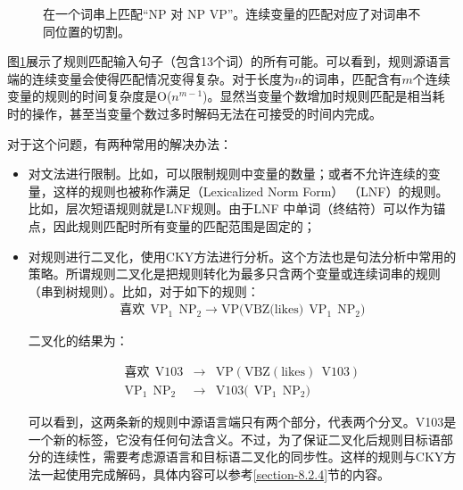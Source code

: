 \begin{figure}[htp]
\centering

\caption{在一个词串上匹配“NP 对 NP VP”。连续变量的匹配对应了对词串不同位置的切割。}
\label{fig:8-43}
\end{figure}

\parinterval 图\ref{fig:8-43}展示了规则匹配输入句子（包含13个词）的所有可能。可以看到，规则源语言端的连续变量会使得匹配情况变得复杂。对于长度为$n$的词串，匹配含有$m$个连续变量的规则的时间复杂度是O($n^{m-1}$)。显然当变量个数增加时规则匹配是相当耗时的操作，甚至当变量个数过多时解码无法在可接受的时间内完成。

\parinterval 对于这个问题，有两种常用的解决办法：
\begin{itemize}
\vspace{0.5em}
\item 对文法进行限制。比如，可以限制规则中变量的数量；或者不允许连续的变量，这样的规则也被称作满足{\small{}}（Lexicalized Norm Form） （LNF）的规则。比如，层次短语规则就是LNF规则。由于LNF 中单词（终结符）可以作为锚点，因此规则匹配时所有变量的匹配范围是固定的；
\vspace{0.5em}
\item 对规则进行二叉化，使用CKY方法进行分析。这个方法也是句法分析中常用的策略。所谓规则二叉化是把规则转化为最多只含两个变量或连续词串的规则（串到树规则）。比如，对于如下的规则：
\begin{eqnarray}
\textrm{喜欢}\ \ \textrm{VP}_1\ \ \textrm{NP}_2 \rightarrow \textrm{VP(VBZ(likes)}\ \ \textrm{VP}_1\ \ \textrm{NP}_2 ) \nonumber
\end{eqnarray}

\noindent 二叉化的结果为：

\begin{eqnarray}
\textrm{喜欢}\ \ \textrm{V103} &\rightarrow& \textrm{VP}(\textrm{VBZ}(\textrm{likes})\ \ \textrm{V103} ) \nonumber \\
\textrm{VP}_1\ \ \textrm{NP}_2 &\rightarrow& \textrm{V103(}\ \ \textrm{VP}_1\ \ \textrm{NP}_2 ) \nonumber
\end{eqnarray}

\noindent 可以看到，这两条新的规则中源语言端只有两个部分，代表两个分叉。V103是一个新的标签，它没有任何句法含义。不过，为了保证二叉化后规则目标语部分的连续性，需要考虑源语言和目标语二叉化的同步性。这样的规则与CKY方法一起使用完成解码，具体内容可以参考\ref{section-8.2.4}节的内容。
\vspace{0.5em}
\end{itemize}

